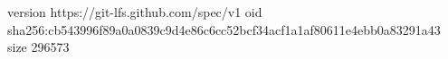 version https://git-lfs.github.com/spec/v1
oid sha256:cb543996f89a0a0839c9d4e86c6cc52bcf34acf1a1af80611e4ebb0a83291a43
size 296573
